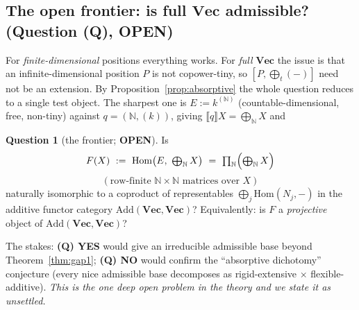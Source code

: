 \documentclass[11pt]{article}
\theoremstyle{plain}
\theoremstyle{definition}
\newtheorem{question}{Question}
\theoremstyle{remark}
\newcommand{\Vect}{\mathbf{Vec}}
\newcommand{\Add}{\mathrm{Add}}
\newcommand{\ext}[1]{\llbracket #1 \rrbracket}
\newcommand{\ihom}[2]{[#1,#2]}
\newcommand{\Hom}{\mathrm{Hom}}
\begin{document}
\subsection{The open frontier: is full $\Vect$ admissible? (Question (Q), \textbf{OPEN})}

For \emph{finite-dimensional} positions everything works. For \emph{full} $\Vect$ the issue is that
an infinite-dimensional position $P$ is not copower-tiny, so $\ihom{P}{\bigoplus_t(-)}$ need not be
an extension. By Proposition~\ref{prop:absorptive} the whole question reduces to a single test
object. The sharpest one is $E:=k^{(\mathbb N)}$ (countable-dimensional, free, non-tiny) against
$q=(\mathbb N,(k))$, giving $\ext{q}X=\bigoplus_{\mathbb N}X$ and

\begin{question}[the frontier; \textbf{OPEN}]
\label{q:Q}
Is
\[
   F(X)\ :=\ \Hom\bigl(E,\ \textstyle\bigoplus_{\mathbb N}X\bigr)\ =\ \prod_{\mathbb N}\Bigl(\bigoplus_{\mathbb N}X\Bigr)
\]
\[
   (\text{row-finite }\mathbb N\times\mathbb N\text{ matrices over }X)
\]
naturally isomorphic to a coproduct of representables $\bigoplus_{j}\Hom(N_j,-)$ in the additive
functor category $\Add(\Vect,\Vect)$? Equivalently: is $F$ a \emph{projective} object of
$\Add(\Vect,\Vect)$?
\end{question}

\noindent The stakes: \textbf{(Q) YES} would give an irreducible admissible base beyond
Theorem~\ref{thm:gap1}; \textbf{(Q) NO} would confirm the ``absorptive dichotomy'' conjecture (every
nice admissible base decomposes as rigid-extensive $\times$ flexible-additive). \emph{This is the one
deep open problem in the theory and we state it as unsettled.}
\end{document}
